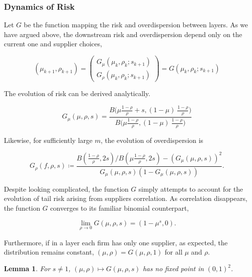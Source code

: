 \documentclass[american, abstract=on]{scrartcl}
\theoremstyle{plain}
\newtheorem{lemma}{Lemma}
\begin{document}
\subsubsection{Dynamics of Risk}

Let $G$ be the function mapping the risk and overdispersion between layers. As we have argued above, the downstream risk and overdispersion depend only on the current one and supplier choices,

\begin{equation}
  (\mu_{k + 1}, \rho_{k + 1}) =  \begin{pmatrix}
    G_{\mu}(\mu_k, \rho_k; s_{k + 1}) \\ G_{\rho}(\mu_k, \rho_k; s_{k + 1})
  \end{pmatrix} = G(\mu_k, \rho_k; s_{k + 1})
\end{equation}

The evolution of risk can be derived analytically.

\begin{equation}
  G_\mu(\mu, \rho, s) = \frac{B\Big( \mu \frac{1 - \rho}{\rho} + s, (1 - \mu) \  \frac{1 - \rho}{\rho} \Big)}{B\Big( \mu \frac{1 - \rho}{\rho}, (1 - \mu) \ \frac{1 - \rho}{\rho} \Big)}
\end{equation}

Likewise, for sufficiently large $m$, the evolution of overdispersion is

\begin{equation}
  G_\rho(f, \rho, s) \coloneqq  \frac{ B\left(\frac{1 - \rho}{\rho}, 2s \right) \Big/ B\left(\mu \frac{1 - \rho}{\rho}, 2s \right) - (G_\mu(\mu, \rho, s))^2}{G_\mu(\mu, \rho, s) (1 - G_\mu(\mu, \rho, s))}.
\end{equation}

Despite looking complicated, the function $G$ simply attempts to account for the evolution of tail risk arising from suppliers correlation. As correlation disappears, the function $G$ converges to its familiar binomial counterpart,

\begin{equation}
  \lim_{\rho \rightarrow 0} G(\mu, \rho, s) = (1 - \mu^{s}, 0).
\end{equation}

Furthermore, if in a layer each firm has only one supplier, as expected, the distribution remains constant, $(\mu, \rho) = G(\mu, \rho, 1)$ for all $\mu$ and $\rho$.

\begin{lemma}
  For $s \neq 1$, $(\mu, \rho) \mapsto G(\mu, \rho, s)$ has no fixed point in $(0, 1)^2$.
\end{lemma}
\end{document}
